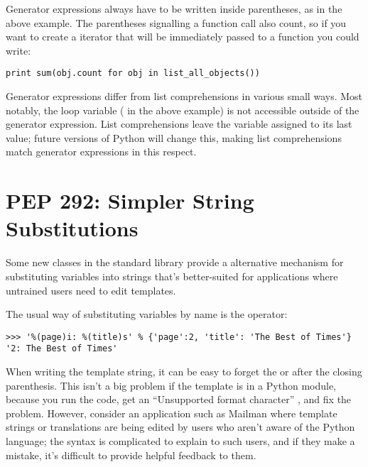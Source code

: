 \documentclass{howto}
\begin{document}
Generator expressions always have to be written inside parentheses, as
in the above example.  The parentheses signalling a function call also
count, so if you want to create a iterator that will be immediately
passed to a function you could write:

\begin{verbatim}
print sum(obj.count for obj in list_all_objects())
\end{verbatim}

Generator expressions differ from list comprehensions in various small
ways.  Most notably, the loop variable ( in the above
example) is not accessible outside of the generator expression.  List
comprehensions leave the variable assigned to its last value; future
versions of Python will change this, making list comprehensions match
generator expressions in this respect.

\begin{seealso}
\end{seealso}


\section{PEP 292: Simpler String Substitutions}

Some new classes in the standard library provide a
alternative mechanism for substituting variables into strings that's 
better-suited for applications where untrained users need to edit templates.

The usual way of substituting variables by name is the \code{\%}
operator:

\begin{verbatim}
>>> '%(page)i: %(title)s' % {'page':2, 'title': 'The Best of Times'}
'2: The Best of Times'
\end{verbatim}

When writing the template string, it can be easy to forget the
 or  after the closing parenthesis.  This isn't a big
problem if the template is in a Python module, because you run the
code, get an ``Unsupported format character'' ,
and fix the problem.  However, consider an application such as Mailman
where template strings or translations are being edited by users who
aren't aware of the Python language; the syntax is complicated to
explain to such users, and if they make a mistake, it's difficult to
provide helpful feedback to them.
\end{document}
